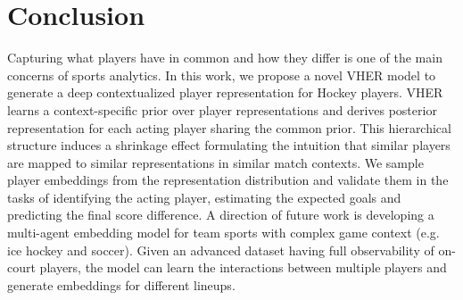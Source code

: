 \documentclass{article}
\begin{document}

\section{Conclusion}
Capturing what players have in common and how they differ is one of the main concerns of sports analytics. 
In this work, we propose a novel VHER model to generate a deep contextualized player representation for Hockey players.  VHER learns a context-specific prior over player representations and derives posterior representation for each acting player sharing the common prior. This hierarchical structure induces a shrinkage effect formulating the intuition that similar players are mapped to similar representations in similar match contexts. We sample player embeddings from the representation distribution and validate them in the tasks of identifying the acting player, estimating the expected goals and predicting the final score difference.
A direction of future work is developing a multi-agent embedding model for team sports with complex game context (e.g. ice hockey and soccer).
Given an advanced dataset having full observability of on-court players, the model can learn the interactions between multiple players and generate embeddings for different lineups.
\end{document}
